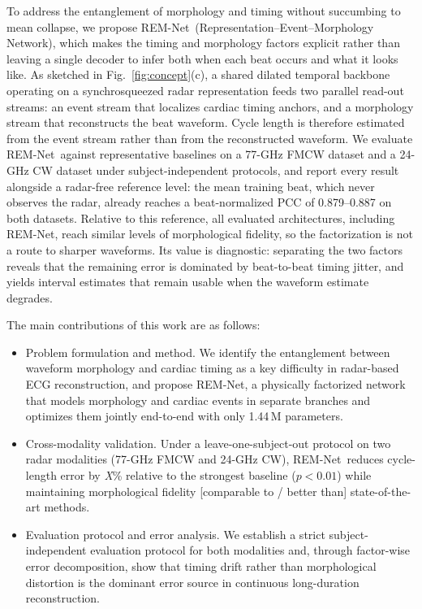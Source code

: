 \documentclass[lettersize,journal]{IEEEtran}
\newcommand{\remnet}{REM-Net\xspace}
\begin{document}
To address the entanglement of morphology and timing without succumbing to mean collapse, we propose \remnet\ (Representation--Event--Morphology Network), which makes the timing and morphology factors explicit rather than leaving a single decoder to infer both when each beat occurs and what it looks like. As sketched in Fig.~\ref{fig:concept}(c), a shared dilated temporal backbone operating on a synchrosqueezed radar representation feeds two parallel read-out streams: an event stream that localizes cardiac timing anchors, and a morphology stream that reconstructs the beat waveform. Cycle length is therefore estimated from the event stream rather than from the reconstructed waveform. We evaluate \remnet\ against representative baselines on a 77-GHz FMCW dataset and a 24-GHz CW dataset under subject-independent protocols, and report every result alongside a radar-free reference level: the mean training beat, which never observes the radar, already reaches a beat-normalized PCC of 0.879--0.887 on both datasets. Relative to this reference, all evaluated architectures, including \remnet, reach similar levels of morphological fidelity, so the factorization is not a route to sharper waveforms. Its value is diagnostic: separating the two factors reveals that the remaining error is dominated by beat-to-beat timing jitter, and yields interval estimates that remain usable when the waveform estimate degrades.

The main contributions of this work are as follows:

\begin{itemize}
    \item {Problem formulation and method.} We identify the entanglement between waveform morphology and cardiac timing as a key difficulty in radar-based ECG reconstruction, and propose \remnet, a physically factorized network that models morphology and cardiac events in separate branches and optimizes them jointly end-to-end with only 1.44\,M parameters.
    \item {Cross-modality validation.} Under a leave-one-subject-out protocol on two radar modalities (77-GHz FMCW and 24-GHz CW), \remnet\ reduces cycle-length error by \emph{X}\% relative to the strongest baseline ($p < 0.01$) while maintaining morphological fidelity [comparable to / better than] state-of-the-art methods.
    \item {Evaluation protocol and error analysis.} We establish a strict subject-independent evaluation protocol for both modalities and, through factor-wise error decomposition, show that timing drift rather than morphological distortion is the dominant error source in continuous long-duration reconstruction.
\end{itemize}
\end{document}
